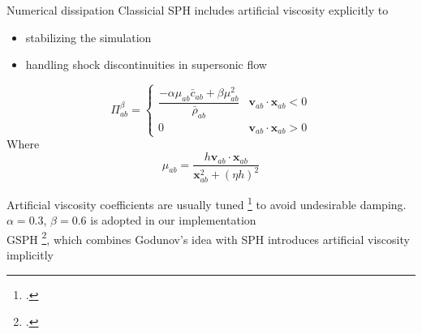 \documentclass{beamer}
\begin{document}
\begin{frame}{Numerical dissipation}
Classicial SPH includes artificial viscosity explicitly to 
\begin{itemize}
\item stabilizing the simulation 
\item handling shock discontinuities in supersonic flow
\end{itemize}
\begin{equation}
\Pi_{ab}^{\beta} = 
\begin{cases} 
      \dfrac{- \alpha \mu_{ab} \bar{c}_{ab} + \beta \mu_{ab}^2} {\bar{\rho}_{ab}} & \textbf{v}_{ab} \cdot \textbf{x}_{ab} < 0\\
      0 & \textbf{v}_{ab} \cdot \textbf{x}_{ab} > 0
\end{cases}
\label{eq:art-vis-shock}
\end{equation}
Where
\begin{equation}
\mu_{ab} = \dfrac{h \textbf{v}_{ab} \cdot \textbf{x}_{ab}}{\textbf{x}_{ab}^2 + \left(\eta h\right)^2} 
\end{equation}

Artificial viscosity coefficients are usually tuned \footcite{cullen2010inviscid} to avoid undesirable damping.\\
$\alpha = 0.3$, $\beta = 0.6$ is adopted in our implementation \\
GSPH \footcite{inutsuka2002reformulation}, which combines Godunov's idea with SPH introduces artificial viscosity implicitly \\
\end{frame}
\end{document}
